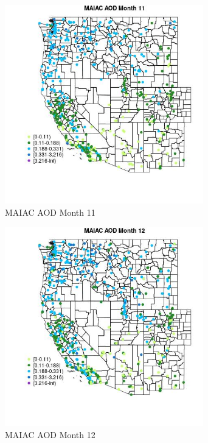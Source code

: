 \begin{figure} 
\centering  
\includegraphics[width=0.77\textwidth]{Code_Outputs/Report_ML_input_PM25_Step4_part_e_de_duplicated_aves_compiled_2019-05-14wNAs_MapObsMo11MAIAC_AOD.jpg} 
\caption{\label{fig:Report_ML_input_PM25_Step4_part_e_de_duplicated_aves_compiled_2019-05-14wNAsMapObsMo11MAIAC_AOD}MAIAC AOD Month 11} 
\end{figure} 
 

\begin{figure} 
\centering  
\includegraphics[width=0.77\textwidth]{Code_Outputs/Report_ML_input_PM25_Step4_part_e_de_duplicated_aves_compiled_2019-05-14wNAs_MapObsMo12MAIAC_AOD.jpg} 
\caption{\label{fig:Report_ML_input_PM25_Step4_part_e_de_duplicated_aves_compiled_2019-05-14wNAsMapObsMo12MAIAC_AOD}MAIAC AOD Month 12} 
\end{figure} 
 

